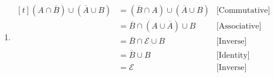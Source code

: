 \begin{enumerate}[leftmargin=2cm,labelsep=.5cm,label=\bf\arabic*.]
\item $
\begin{aligned}[t]
(A \cap \overline{B}) \cup (\overline{A} \cup B) &= (\overline{B} \cap A) \cup (\overline{A} \cup B) & \text{[Commutative]}\\
&= \overline{B} \cap (A \cup \overline{A}) \cup B & \text{[Associative]}\\
&= \overline{B} \cap \mathscr{E} \cup B & \text{[Inverse]}\\
&= \overline{B} \cup B & \text{[Identity]}\\
&= \mathscr{E} & \text{[Inverse]}
\end{aligned} $
\end{enumerate}
